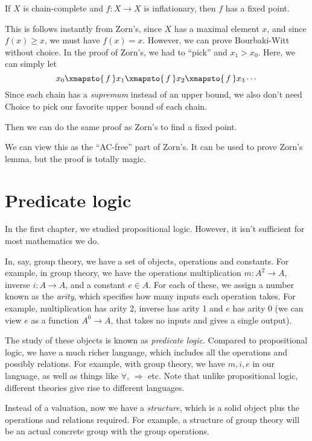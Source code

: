 \documentclass[a4paper]{article}
\begin{document}
\begin{thm}
  If $X$ is chain-complete and $f: X\to X$ is inflationary, then $f$ has a fixed point.
\end{thm}
This is follows instantly from Zorn's, since $X$ has a maximal element $x$, and since $f(x) \geq x$, we must have $f(x) = x$. However, we can prove Bourbaki-Witt without choice. In the proof of Zorn's, we had to ``pick'' and $x_1 > x_0$. Here, we can simply let
\[
  x_0 \xmapsto{\,f\,} x_1 \xmapsto{\,f\,} x_2 \xmapsto{\,f\,} x_3 \cdots
\]
Since each chain has a \emph{supremum} instead of an upper bound, we also don't need Choice to pick our favorite upper bound of each chain.

Then we can do the same proof as Zorn's to find a fixed point.

We can view this as the ``AC-free'' part of Zorn's. It can be used to prove Zorn's lemma, but the proof is totally magic.

\section{Predicate logic}
\label{sec:predicate}
In the first chapter, we studied propositional logic. However, it isn't sufficient for most mathematics we do.

In, say, group theory, we have a set of objects, operations and constants. For example, in group theory, we have the operations multiplication $m: A^2 \to A$, inverse $i: A\to A$, and a constant $e\in A$. For each of these, we assign a number known as the \emph{arity}, which specifies how many inputs each operation takes. For example, multiplication has arity 2, inverse has arity 1 and $e$ has arity $0$ (we can view $e$ as a function $A^0 \to A$, that takes no inputs and gives a single output).

The study of these objects is known as \emph{predicate logic}. Compared to propositional logic, we have a much richer language, which includes all the operations and possibly relations. For example, with group theory, we have $m, i, e$ in our language, as well as things like $\forall$, $\Rightarrow$ etc. Note that unlike propositional logic, different theories give rise to different languages.

Instead of a valuation, now we have a \emph{structure}, which is a solid object plus the operations and relations required. For example, a structure of group theory will be an actual concrete group with the group operations.
\end{document}
